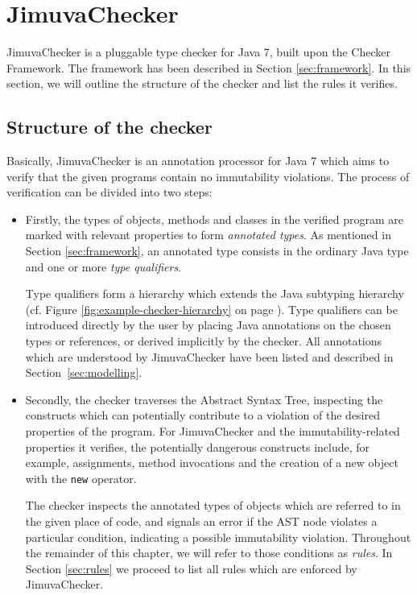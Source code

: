 \documentclass{pracamgr}
\theoremstyle{all}
\begin{document}
\section{JimuvaChecker}

JimuvaChecker is a pluggable type checker for Java 7, built upon the
Checker Framework. The framework has been described in Section
\ref{sec:framework}.  In this section, we will outline the structure
of the checker and list the rules it verifies.

\subsection{Structure of the checker}

Basically, JimuvaChecker is an annotation processor for Java 7 which
aims to verify that the given programs contain no immutability
violations. The process of verification can be divided into two steps:
\begin{itemize}
\item Firstly, the types of objects, methods and classes in the
  verified program are marked with relevant properties to form
  \emph{annotated types}. As mentioned in Section \ref{sec:framework},
  an annotated type consists in the ordinary Java type and one or more
  \emph{type qualifiers}.

  Type qualifiers form a hierarchy which extends the Java subtyping
  hierarchy (cf. Figure \ref{fig:example-checker-hierarchy} on page
  \pageref{fig:example-checker-hierarchy}). Type qualifiers can be
  introduced directly by the user by placing Java annotations on the
  chosen types or references, or derived implicitly by the
  checker. All annotations which are understood by JimuvaChecker have
  been listed and described in Section~\ref{sec:modelling}.
\item Secondly, the checker traverses the Abstract Syntax Tree,
  inspecting the constructs which can potentially contribute to a
  violation of the desired properties of the program. For
  JimuvaChecker and the immutability-related properties it verifies,
  the potentially dangerous constructs include, for example,
  assignments, method invocations and the creation of a new object
  with the \texttt{new} operator. 

  The checker inspects the annotated types of objects which are
  referred to in the given place of code, and signals an error if the
  AST node violates a particular condition, indicating a possible
  immutability violation. Throughout the remainder of this chapter, we
  will refer to those conditions as \emph{rules}. In Section
  \ref{sec:rules} we proceed to list all rules which are enforced by
  JimuvaChecker.
\end{itemize}
\end{document}
